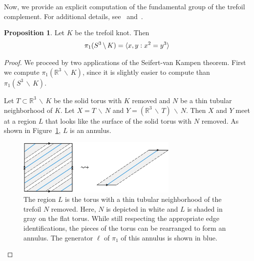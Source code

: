 \documentclass[12pt,twoside]{reedthesis}
\theoremstyle{definition}
\newtheorem{prop}[thm]{Proposition}
\newcommand{\R}{\mathbb{R}}
\newcommand{\wo}{\, \backslash \,}
\DeclarePairedDelimiter\ang{\langle}{\rangle}
\begin{document}
Now, we provide an explicit computation of the fundamental group of the trefoil complement.
For additional details, see~\cite[47--49]{hatcher2002} and~\cite[153--154]{stillwell1993}.

\begin{prop}
  Let $K$ be the trefoil knot.
  Then
  \begin{equation*}
    \pi_1(S^3 \wo K) = \ang{x, y : x^2 = y^3}
  \end{equation*}
\end{prop}

\begin{proof}
  We proceed by two applications of the Seifert-van Kampen theorem.
  First we compute $\pi_1(\R^3 \wo K)$, since it is slightly easier to compute than $\pi_1(S^3 \wo K)$.

  Let $T \subset \R^3 \wo K$ be the solid torus with $K$ removed and $N$ be a thin tubular neighborhood of $K$.
  Let $X = T \wo N$ and $Y = (\R^3 \wo T) \wo N$.
  Then $X$ and $Y$ meet at a region $L$ that looks like the surface of the solid torus with $N$ removed.
  As shown in Figure~\ref{fig:flat_annulus}, $L$ is an annulus.

  \begin{figure}[h]
    \centering
    \includegraphics[width=0.7\textwidth]{figures/fundamental_group_flat.pdf}
    \caption{The region $L$ is the torus with a thin tubular neighborhood of the trefoil $N$ removed. Here, $N$ is depicted in white and $L$ is shaded in gray on the flat torus. While still respecting the appropriate edge identifications, the pieces of the torus can be rearranged to form an annulus. The generator $\ell$ of $\pi_1$ of this annulus is shown in blue.}
    \label{fig:flat_annulus}
  \end{figure}


\end{proof}
\end{document}
